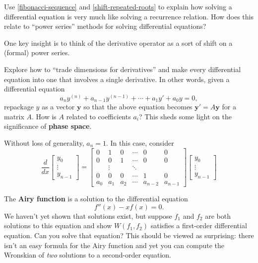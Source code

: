 \documentclass{homework}
\begin{document}
\begin{problem}\label{recurrence-differential-analogy}Use \ref{fibonacci-sequence} and \ref{shift-repeated-roots} to
  explain how solving a differential equation is very much like
  solving a recurrence relation.  How does this relate to ``power
  series'' methods for solving differential equations?
\end{problem}

\begin{solution}
  One key insight is to think of the derivative operator as a sort of
  shift on a (formal) power series.
\end{solution}

\begin{problem}\label{introduction-phase-space}Explore how to ``trade dimensions for derivatives'' and make every differential equation into one that involves a single derivative.  In other words, given a differential equation
  \[
    a_n y^{(n)} + a_{n-1} y^{(n-1)} + \cdots + a_1 y' + a_0 y  = 0,
  \]
  repackage $y$ as a vector $\textbf{y}$ so that the above equation becomes $\textbf{y}' = A \textbf{y}$ for a matrix $A$.  How is $A$ related to coefficients $a_i$?  This sheds some light on the significance of \textbf{phase space}.
\end{problem}

\begin{solution}
  Without loss of generality, $a_n = 1$.  In this case, consider
  \[
    \frac{d}{dx} \begin{bmatrix} y_0 \\ \vdots \\ y_{n-1} \end{bmatrix} =
    \begin{bmatrix}
      0 & 1 & 0 & \cdots & 0 & 0\\
      0 & 0 & 1 & \cdots & 0 & 0 \\
        & \vdots &   & \ddots \\
      0 & 0 & 0 & \cdots & 1 & 0\\
      a_0 & a_1 & a_2 & \cdots & a_{n-2} & a_{n-1}
    \end{bmatrix} \begin{bmatrix} y_0 \\ \vdots \\ y_{n-1} \end{bmatrix}
  \]

  
\end{solution}

\begin{problem}\label{introduction-airy-function}The \textbf{Airy function} is a solution to the differential equation
  \[
    f''(x) - x f(x) = 0.
  \]
  We haven't yet shown that solutions exist, but suppose $f_1$ and
  $f_2$ are both solutions to this equation and show $W(f_1,f_2)$
  satisfies a first-order differential equation.  Can you solve that
  equation?  This should be viewed as surprising: there isn't an easy
  formula for the Airy function and yet you can compute the Wronskian
  of \textit{two} solutions to a second-order equation.
\end{problem}
\end{document}
